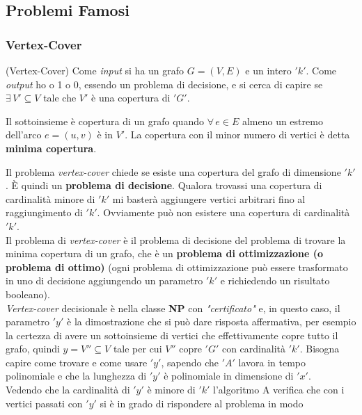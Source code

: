 			\subsection{Problemi Famosi}
			\subsubsection{Vertex-Cover}
			
			\begin{definizione}(Vertex-Cover)
				Come \textit{input} si ha un grafo
				$G=(V,E)$ e un intero $ 'k' $. Come \textit{output} ho o 1 o 0, essendo un problema di
				decisione, e si cerca di capire se $\exists\, V'\subseteq V$ tale che $V'$ è
				una copertura di $ 'G' $.
				\begin{nota}
					Il sottoinsieme è copertura di un grafo quando
					$\forall\, e\in E$ almeno un estremo dell'arco $e=(u,v)$ è in $V'$. La
					copertura con il minor numero di vertici è detta \textbf{minima copertura}.
				\end{nota}
				Il problema \emph{vertex-cover} chiede se esiste una copertura del grafo di
				dimensione $ 'k' $. È quindi un \textbf{problema di decisione}. Qualora trovassi
				una copertura di cardinalità minore di $ 'k' $ mi basterà aggiungere vertici
				arbitrari fino al raggiungimento di $ 'k' $. Ovviamente può non esistere una
				copertura di cardinalità $ 'k' $.\\
				Il problema di \emph{vertex-cover} è il problema di decisione del problema di
				trovare la minima copertura di un grafo, che è un \textbf{problema di
				ottimizzazione (o problema di ottimo)} (ogni problema di ottimizzazione può
				essere trasformato in uno di decisione aggiungendo un parametro $ 'k' $ e
				richiedendo un risultato booleano).\\
				\emph{Vertex-cover} decisionale è nella classe \textbf{NP} con \textit{"certificato"}
				e, in questo caso, il parametro $ 'y' $ è la dimostrazione che si può dare risposta
				affermativa, per esempio la certezza di avere un sottoinsieme di vertici che
				effettivamente copre tutto il grafo, quindi $y=V''\subseteq V$ tale per cui
				$V''$ copre $ 'G' $ con cardinalità $ 'k' $. Bisogna capire come trovare e come usare
				$ 'y' $, sapendo che $ 'A' $ lavora in tempo polinomiale e che la lunghezza di $ 'y' $ è
				polinomiale in dimensione di $ 'x' $.\\ 
				Vedendo che la cardinalità di $ 'y' $ è minore di $ 'k' $ l'algoritmo A verifica che
				con i vertici passati con $ 'y' $ si è in grado di rispondere al problema in modo

\end{definizione}
